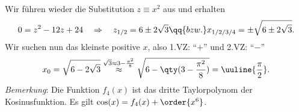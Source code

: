 \begin{enumerate}[label=(\alph*), labelindent=1em,labelsep=0.5cm]
    Wir führen wieder die Substitution $z \equiv x^2$ aus und erhalten 
    \begin{align}
        0 = z^2 - 12 z + 24 \quad \Rightarrow \quad z_{1/2}= 6\pm2\sqrt{3} \qq{bzw.} x_{1/2/3/4} = \pm \sqrt{6\pm 2\sqrt{3}}.
    \end{align}
    Wir suchen nun das kleinste positive $x$, also 1.VZ: ``$+$'' und 2.VZ: ``$-$'' 
    \begin{align}
            x_0 = \sqrt{6-2\sqrt{3}} \overset{\sqrt{3}\approx 3-\frac{\pi^2}{8}}{\approx} \sqrt{6-\qty(3-\frac{\pi^2}{8})} = \uuline{\frac{\pi}{2}}.
    \end{align}
    \emph{Bemerkung}: Die Funktion $f_4(x)$ ist das dritte Taylorpolynom der Kosinusfunktion. Es gilt $\cos(x) = f_4(x) +\order{x^6}$.
\end{enumerate}

